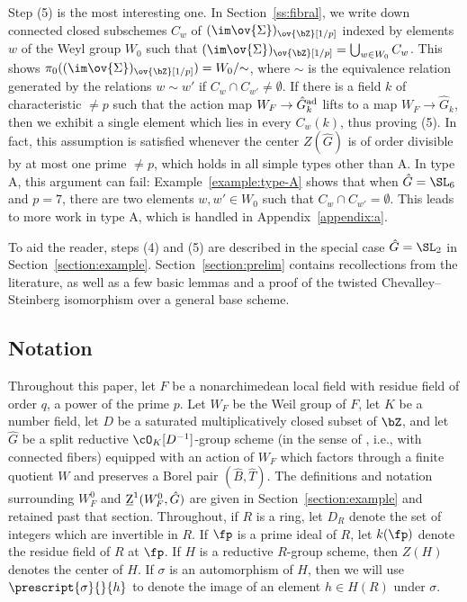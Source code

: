Step (5) is the most interesting one. In Section~\ref{ss:fibral}, we write down connected closed subschemes $C_w$ of $(\im \ov{\Sigma})_{\ov{\bZ}[1/p]}$ indexed by elements $w$ of the Weyl group $W_0$ such that $(\im \ov{\Sigma})_{\ov{\bZ}[1/p]} = \bigcup_{w \in W_0} C_w$. This shows $\pi_0((\im \ov{\Sigma})_{\ov{\bZ}[1/p]}) = W_0/{\sim}$, where $\sim$ is the equivalence relation generated by the relations $w \sim w'$ if $C_w \cap C_{w'} \neq \emptyset$. If there is a field $k$ of characteristic $\neq p$ such that the action map $W_F \to \hat{G}^{\rm{ad}}_k$ lifts to a map $W_F \to \hat{G}_k$, then we exhibit a single element which lies in every $C_w(k)$, thus proving (5). In fact, this assumption is satisfied whenever the center $Z(\hat{G})$ is of order divisible by at most one prime $\neq p$, which holds in all simple types other than A. In type A, this argument can fail: Example~\ref{example:type-A} shows that when $\hat{G} = \SL_6$ and $p = 7$, there are two elements $w, w' \in W_0$ such that $C_w \cap C_{w'} = \emptyset$. This leads to more work in type A, which is handled in Appendix~\ref{appendix:a}. \smallskip

To aid the reader, steps (4) and (5) are described in the special case $\hat{G} = \SL_2$ in Section~\ref{section:example}. Section~\ref{section:prelim} contains recollections from the literature, as well as a few basic lemmas and a proof of the twisted Chevalley--Steinberg isomorphism over a general base scheme.

\subsection{Notation}\label{ss:intro-notation}

Throughout this paper, let $F$ be a nonarchimedean local field with residue field of order $q$, a power of the prime $p$. Let $W_F$ be the Weil group of $F$, let $K$ be a number field, let $D$ be a saturated multiplicatively closed subset of $\bZ$, and let $\hat{G}$ be a split reductive $\cO_K[D^{-1}]$-group scheme (in the sense of \cite[XIX, 2.7]{SGA3III}, i.e., with connected fibers) equipped with an action of $W_F$ which factors through a finite quotient $W$ and preserves a Borel pair $(\hat{B}, \hat{T})$. The definitions and notation surrounding $W_F^0$ and $\underline{\rm{Z}}^1(W_F^0, \hat{G})$ are given in Section~\ref{section:example} and retained past that section. Throughout, if $R$ is a ring, let $D_R$ denote the set of integers which are invertible in $R$. If $\fp$ is a prime ideal of $R$, let $k(\fp)$ denote the residue field of $R$ at $\fp$. If $H$ is a reductive $R$-group scheme, then $Z(H)$ denotes the center of $H$. If $\sigma$ is an automorphism of $H$, then we will use $\prescript{\sigma}{}{h}$ to denote the image of an element $h \in H(R)$ under $\sigma$.

